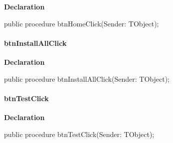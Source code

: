 \documentclass{report}
\newif\ifpdf
\begin{document}
\label{xtypefm.TimdFrm-btnHomeClick}
\begin{list}{}{
\setlength{\itemindent}{0cm}
\setlength{\listparindent}{0cm}
\setlength{\leftmargin}{\evensidemargin}
\addtolength{\leftmargin}{\tmplength}
\settowidth{\labelsep}{X}
\addtolength{\leftmargin}{\labelsep}
\setlength{\labelwidth}{\tmplength}
}
\item[\textbf{Declaration}\hfill]
\ifpdf
\begin{flushleft}
\fi
\begin{ttfamily}
public procedure btnHomeClick(Sender: TObject);\end{ttfamily}

\ifpdf
\end{flushleft}
\fi

\end{list}
\paragraph*{btnInstallAllClick}\hspace*{\fill}

\label{xtypefm.TimdFrm-btnInstallAllClick}
\begin{list}{}{
\setlength{\itemindent}{0cm}
\setlength{\listparindent}{0cm}
\setlength{\leftmargin}{\evensidemargin}
\addtolength{\leftmargin}{\tmplength}
\settowidth{\labelsep}{X}
\addtolength{\leftmargin}{\labelsep}
\setlength{\labelwidth}{\tmplength}
}
\item[\textbf{Declaration}\hfill]
\ifpdf
\begin{flushleft}
\fi
\begin{ttfamily}
public procedure btnInstallAllClick(Sender: TObject);\end{ttfamily}

\ifpdf
\end{flushleft}
\fi

\end{list}
\paragraph*{btnTestClick}\hspace*{\fill}

\label{xtypefm.TimdFrm-btnTestClick}
\begin{list}{}{
\setlength{\itemindent}{0cm}
\setlength{\listparindent}{0cm}
\setlength{\leftmargin}{\evensidemargin}
\addtolength{\leftmargin}{\tmplength}
\settowidth{\labelsep}{X}
\addtolength{\leftmargin}{\labelsep}
\setlength{\labelwidth}{\tmplength}
}
\item[\textbf{Declaration}\hfill]
\ifpdf
\begin{flushleft}
\fi
\begin{ttfamily}
public procedure btnTestClick(Sender: TObject);\end{ttfamily}

\ifpdf
\end{flushleft}
\fi

\end{list}
\end{document}

